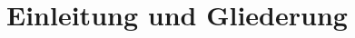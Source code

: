 \ifIncludeMiscellaneous
\part{Einleitung und Gliederung}
\label{part:Einleitung-und-Gliederung}
\fi






